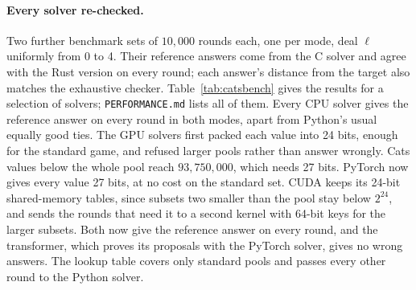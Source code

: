 \documentclass[11pt,a4paper]{article}
\theoremstyle{definition}
\theoremstyle{remark}
\begin{document}
\paragraph{Every solver re-checked.}
Two further benchmark sets of $10{,}000$ rounds each, one per mode, deal $\ell$ uniformly from 0 to 4.
Their reference answers come from the C solver and agree with the Rust version on every round; each
answer's distance from the target also matches the exhaustive checker. Table~\ref{tab:catsbench} gives
the results for a selection of solvers; \texttt{PERFORMANCE.md} lists all of them. Every CPU solver gives
the reference answer on every round in both modes, apart from Python's usual equally good ties. The GPU
solvers first packed each value into 24 bits, enough for the standard game, and refused larger pools rather
than answer wrongly. Cats values below the whole pool reach $93{,}750{,}000$, which needs 27 bits. PyTorch
now gives every value 27 bits, at no cost on the standard set. CUDA keeps its 24-bit shared-memory tables,
since subsets two smaller than the pool stay below $2^{24}$, and sends the rounds that need it to a second
kernel with 64-bit keys for the larger subsets. Both now give the reference answer on every round, and the
transformer, which proves its proposals with the PyTorch solver, gives no wrong answers. The lookup table
covers only standard pools and passes every other round to the Python solver.
\end{document}
